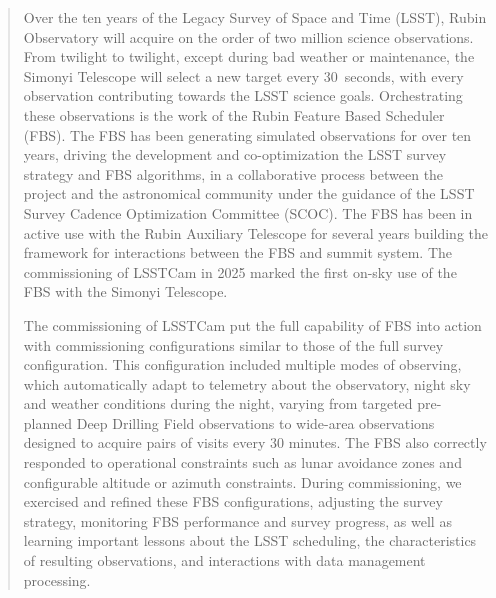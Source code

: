 
\begin{abstract}
Over the ten years of the Legacy Survey of Space and Time (LSST), Rubin Observatory will acquire on the order of two million science observations. From twilight to twilight, except during bad weather or maintenance, the Simonyi Telescope will select a new target every 30~seconds, with every observation contributing towards the LSST science goals.  Orchestrating these observations is the work of the Rubin Feature Based Scheduler (FBS).  
The FBS has been generating simulated observations for over ten years, driving the development and co-optimization the LSST survey strategy and FBS algorithms, in a collaborative process between the project and the astronomical community under the guidance of the LSST Survey Cadence Optimization Committee (SCOC). The FBS has been in active use with the Rubin Auxiliary Telescope for several years building the framework for interactions between the FBS and summit system.  The commissioning of LSSTCam in 2025 marked the first on-sky use of the FBS with the Simonyi Telescope.

The commissioning of LSSTCam put the full capability of FBS into action with commissioning configurations similar to those of the full survey configuration. This configuration included multiple modes of observing, which automatically adapt to telemetry about the observatory, night sky and weather conditions during the night, varying from targeted pre-planned Deep Drilling Field observations to wide-area observations designed to acquire pairs of visits every 30 minutes. The FBS also correctly responded to operational constraints such as lunar avoidance zones and configurable altitude or azimuth constraints. During commissioning, we exercised and refined these FBS configurations, adjusting the survey strategy, monitoring FBS performance and survey progress, as well as learning important lessons about the LSST scheduling, the characteristics of resulting observations, and interactions with data management processing. 
\end{abstract}

